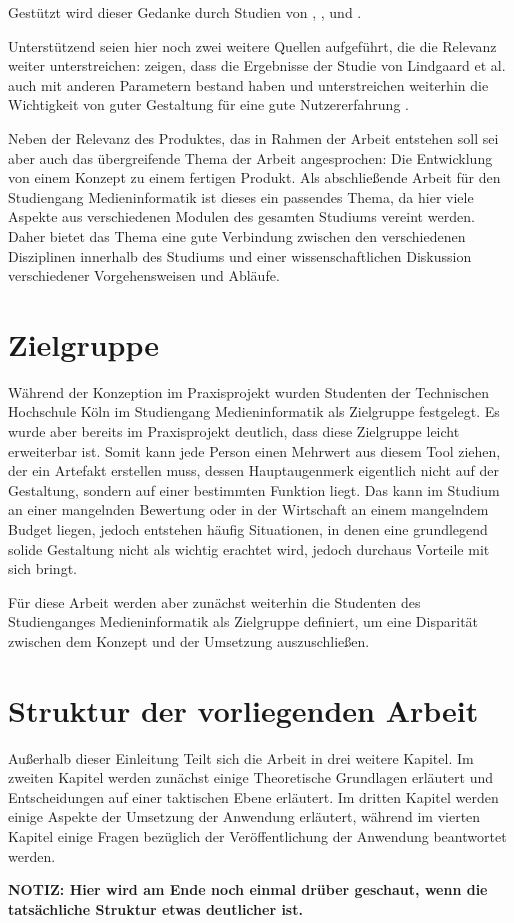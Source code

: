 Gestützt wird dieser Gedanke durch Studien von \cite{lindgaard2006attention}, \cite{campbell1996fitting}, und \cite{nickerson1998confirmation}.

Unterstützend seien hier noch zwei weitere Quellen aufgeführt, die die Relevanz weiter unterstreichen:
\cite{tractinsky2006evaluating} zeigen, dass die Ergebnisse der Studie von Lindgaard et al. auch mit anderen Parametern bestand haben und unterstreichen weiterhin die Wichtigkeit von guter Gestaltung für eine gute Nutzererfahrung \cite{tractinsky2000beautiful}.

Neben der Relevanz des Produktes, das in Rahmen der Arbeit entstehen soll sei aber auch das übergreifende Thema der Arbeit angesprochen: Die Entwicklung von einem Konzept zu einem fertigen Produkt.
Als abschließende Arbeit für den Studiengang Medieninformatik ist dieses ein passendes Thema, da hier viele Aspekte aus verschiedenen Modulen des gesamten Studiums vereint werden. Daher bietet das Thema eine gute Verbindung zwischen den verschiedenen Disziplinen innerhalb des Studiums und einer wissenschaftlichen Diskussion verschiedener Vorgehensweisen und Abläufe.


\section{Zielgruppe}
Während der Konzeption im Praxisprojekt wurden Studenten der Technischen Hochschule Köln im Studiengang Medieninformatik als Zielgruppe festgelegt. Es wurde aber bereits im Praxisprojekt deutlich, dass diese Zielgruppe leicht erweiterbar ist. Somit kann jede Person einen Mehrwert aus diesem Tool ziehen, der ein Artefakt erstellen muss, dessen Hauptaugenmerk eigentlich nicht auf der Gestaltung, sondern auf einer bestimmten Funktion liegt. Das kann im Studium an einer mangelnden Bewertung oder in der Wirtschaft an einem mangelndem Budget liegen, jedoch entstehen häufig Situationen, in denen eine grundlegend solide Gestaltung nicht als wichtig erachtet wird, jedoch durchaus Vorteile mit sich bringt.

Für diese Arbeit werden aber zunächst weiterhin die Studenten des Studienganges Medieninformatik als Zielgruppe definiert, um eine Disparität zwischen dem Konzept und der Umsetzung auszuschließen.

\section{Struktur der vorliegenden Arbeit}
Außerhalb dieser Einleitung Teilt sich die Arbeit in drei weitere Kapitel. Im zweiten Kapitel werden zunächst einige Theoretische Grundlagen erläutert und Entscheidungen auf einer taktischen Ebene erläutert. Im dritten Kapitel werden einige Aspekte der Umsetzung der Anwendung erläutert, während im vierten Kapitel einige Fragen bezüglich der Veröffentlichung der Anwendung beantwortet werden.

\textbf{NOTIZ: Hier wird am Ende noch einmal drüber geschaut, wenn die tatsächliche Struktur etwas deutlicher ist.}
